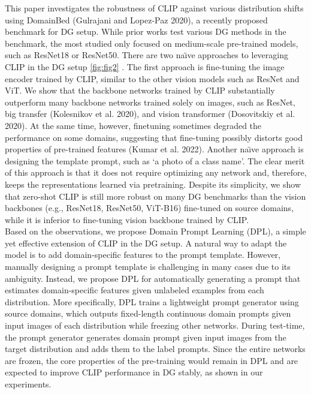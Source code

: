 \documentclass[11pt,twocolumn]{article}
\begin{document}
\hspace{1cm}
This paper investigates the robustness of CLIP against various distribution shifts using DomainBed (Gulrajani and Lopez-Paz 2020), a recently proposed benchmark for DG setup. While prior works test various DG methods in the benchmark, the most studied only focused on medium-scale pre-trained models, such as ResNet18 or ResNet50. There are two na\"{\i}ve approaches to leveraging CLIP in the DG setup \autoref{fig:fig2} . The first approach is fine-tuning the image encoder trained by CLIP, similar to the other vision models such as ResNet and ViT. We show that the backbone networks trained by CLIP substantially outperform many backbone networks trained solely on images, such as ResNet, big transfer (Kolesnikov et al. 2020), and vision transformer (Dosovitskiy et al. 2020). At the same time, however, finetuning sometimes degraded the performance on some domains, suggesting that fine-tuning possibly distorts good properties of pre-trained features (Kumar et al. 2022). Another na\"{\i}ve approach is designing the template prompt, such as ‘a photo of a {class name}’. The clear merit of this approach is that it does not require optimizing any network and, therefore, keeps the representations learned via pretraining. Despite its simplicity, we show that zero-shot CLIP is still more robust on many DG benchmarks than the vision
backbones (e.g., ResNet18, ResNet50, ViT-B16) fine-tuned on source domains, while it is inferior to fine-tuning vision
backbone trained by CLIP.\\
\hspace{1cm}
Based on the observations, we propose Domain Prompt Learning (DPL), a simple yet effective extension of CLIP in the DG setup. A natural way to adapt the model is to add domain-specific features to the prompt template. However, manually designing a prompt template is challenging in many cases due to its ambiguity. Instead, we propose DPL for automatically generating a prompt that estimates domain-specific features given unlabeled examples from each distribution. More specifically, DPL trains a lightweight prompt generator using source domains, which outputs fixed-length continuous domain prompts given input images of each distribution while freezing other networks. During test-time, the prompt generator generates domain prompt given input images from the target distribution and adds them to the label prompts. Since the entire networks are frozen, the core properties of the pre-training would remain in DPL and are expected to improve CLIP performance in DG stably, as shown in our experiments.\\
\end{document}
